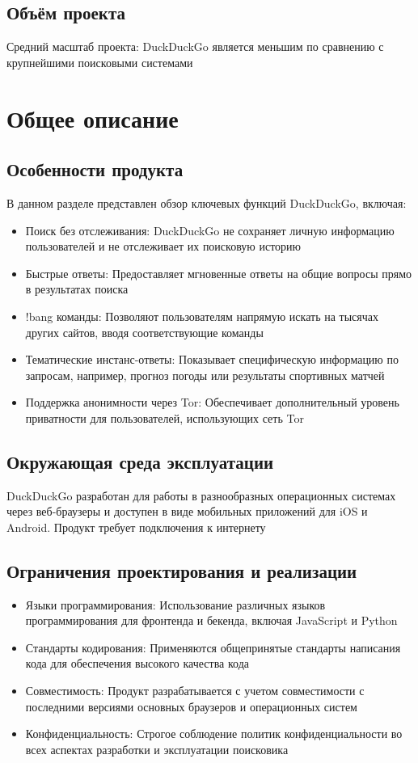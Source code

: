 \documentclass[12pt,a4paper]{article}
\begin{document}
\subsection{Объём проекта}
Средний масштаб проекта: DuckDuckGo является меньшим по сравнению с крупнейшими поисковыми системами
\section{Общее описание}
\subsection{Особенности продукта}
В данном разделе представлен обзор ключевых функций DuckDuckGo, включая:
\begin{itemize}
    \item Поиск без отслеживания: DuckDuckGo не сохраняет личную информацию пользователей и не отслеживает их поисковую историю
    \item Быстрые ответы: Предоставляет мгновенные ответы на общие вопросы прямо в результатах поиска
    \item !bang команды: Позволяют пользователям напрямую искать на тысячах других сайтов, вводя соответствующие команды
    \item Тематические инстанс-ответы: Показывает специфическую информацию по запросам, например, прогноз погоды или результаты спортивных матчей
    \item Поддержка анонимности через Tor: Обеспечивает дополнительный уровень приватности для пользователей, использующих сеть Tor
\end{itemize}
\subsection{Окружающая среда эксплуатации}
DuckDuckGo разработан для работы в разнообразных операционных системах через веб-браузеры и доступен в виде мобильных приложений для iOS и Android. Продукт требует подключения к интернету
\subsection{Ограничения проектирования и реализации}
\begin{itemize}
    \item Языки программирования: Использование различных языков программирования для фронтенда и бекенда, включая JavaScript и Python
    \item Стандарты кодирования: Применяются общепринятые стандарты написания кода для обеспечения высокого качества кода
    \item Совместимость: Продукт разрабатывается с учетом совместимости с последними версиями основных браузеров и операционных систем
    \item Конфиденциальность: Строгое соблюдение политик конфиденциальности во всех аспектах разработки и эксплуатации поисковика
\end{itemize}
\end{document}
